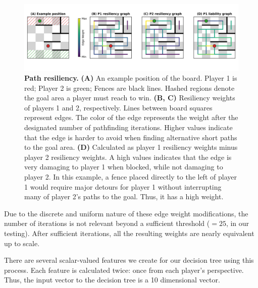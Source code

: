 \documentclass[10pt]{article}
\begin{document}
\begin{figure}[H]
    \centering
    \includegraphics[width=\linewidth]{path_figure.png}
    \caption{\textbf{Path resiliency.} \textbf{(A)} An example position of the board. Player 1 is red; Player 2 is green; Fences are black lines. Hashed regions denote the goal area a player must reach to win. \textbf{(B, C)} Resiliency weights of players 1 and 2, respectively. Lines between board squares represent edges. The color of the edge represents the weight after the designated number of pathfinding iterations. Higher values indicate that the edge is harder to avoid when finding alternative short paths to the goal area. \textbf{(D)} Calculated as player 1 resiliency weights minus player 2 resiliency weights. A high values indicates that the edge is very damaging to player 1 when blocked, while not damaging to player 2. In this example, a fence placed directly to the left of player 1 would require major detours for player 1 without interrupting many of player 2's paths to the goal. Thus, it has a high weight.}
    \label{fig:resiliency}
\end{figure}

Due to the discrete and uniform nature of these edge weight modifications, the number of iterations is not relevant beyond a sufficient threshold ($=25$, in our testing). After sufficient iterations, all the resulting weights are nearly equivalent up to scale.

There are several scalar-valued features we create for our decision tree using this process. Each feature is calculated twice: once from each player's perspective. Thus, the input vector to the decision tree is a 10 dimensional vector.
\end{document}
